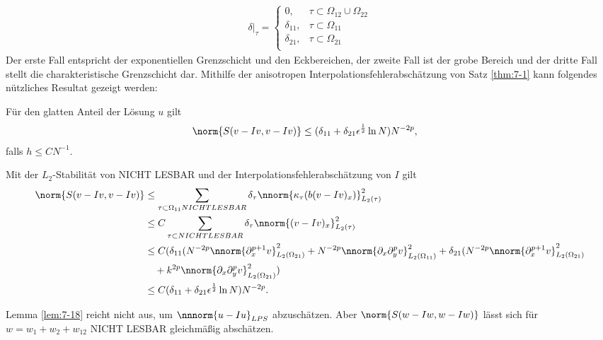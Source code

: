 \begin{align*}
  \delta|_{\tau} =
  \begin{cases}
    0, & \tau \subset \Omega_{12} \cup \Omega_{22}\\
    \delta_{11}, & \tau \subset \Omega_{11} \\
    \delta_{21}, & \tau \subset \Omega_{21} \\
  \end{cases}
\end{align*}
Der erste Fall entspricht der exponentiellen Grenzschicht und den Eckbereichen, der zweite Fall ist der grobe Bereich und der dritte Fall stellt die charakteristische Grenzschicht dar. Mithilfe der anisotropen Interpolationsfehlerabschätzung von Satz \ref{thm:7-1} kann folgendes nützliches Resultat gezeigt werden:
\begin{lemma}\label{lem:7-18}
  Für den glatten Anteil der Lösung $u$ gilt
  \begin{align*}
    \norm{S(v - Iv, v-Iv)} & \leq (\delta_{11} + \delta_{21}\epsilon^{\frac 12} \ln N)N^{-2p}, 
  \end{align*}
falls $h \leq CN^{-1}$. 
\end{lemma}
\begin{beweis}
  Mit der $L_{2}$-Stabilität von NICHT LESBAR und der Interpolationsfehlerabschätzung von $I$ gilt
  \begin{align*}
\norm{S(v - Iv, v-Iv)} & \leq \sum_{\tau \subset \Omega_{11} NICHT LESBAR} \delta_{\tau} \nnorm{\kappa_{\tau}(b(v-Iv)_{x})}_{L_{2}(\tau)}^{2}\\
& \leq C \sum_{\tau \subset NICHT LESBAR} \delta_{\tau} \nnorm{(v-Iv)_{x}}_{L_{2}(\tau)}^{2}\\
& \leq C (\delta_{11}(N^{-2p} \nnorm{\partial_{x}^{p+1}v}_{L_{2}(\Omega_{21})}^{2} + N^{-2p} \nnorm{\partial_{x}\partial_{y}^{p}v}^{2}_{L_{2}(\Omega_{11})}+ \delta_{21} (N^{-2p}\nnorm{\partial_{x}^{p+1}v}^{2}_{L_{2}(\Omega_{21})} \\
& \quad + k^{2p} \nnorm{\partial_{x}\partial_{y}^{p}v}^{2}_{L_{2}(\Omega_{21})})\\
& \leq C (\delta_{11} + \delta_{21}\epsilon^{\frac 12} \ln N)N^{-2p}. 
  \end{align*}
\end{beweis}

Lemma \ref{lem:7-18} reicht nicht aus, um $\nnnorm{u - Iu}_{LPS}$ abzuschätzen. Aber $\norm{S(w - Iw, w- Iw)}$ lässt sich für $w = w_{1} + w_{2} + w_{12}$ NICHT LESBAR gleichmäßig abschätzen. 

